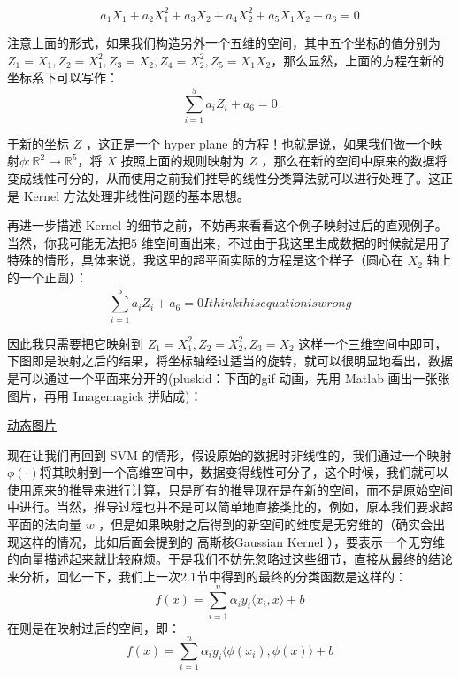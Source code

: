 \documentclass[a4paper,12pt]{article}
\begin{document}
\begin{equation}
  a_1X_1+a_2X_1^2+ a_3X_2+a_4X_2^2+a_5X_1X_2+a_6=0
\end{equation}

 注意上面的形式，如果我们构造另外一个五维的空间，其中五个坐标的值分别为 $Z_1=X_1, Z_2=X^2_1, Z_3=X_2, Z_4=X^2_2, Z_5=X_1X_2$，那么显然，上面的方程在新的坐标系下可以写作：
\begin{equation}
  \sum_{i=1}^5a_iZ_i+a_6=0
\end{equation}

于新的坐标 $Z$ ，这正是一个 hyper plane 的方程！也就是说，如果我们做一个映射$\phi:\mathbb{R}^2\rightarrow\mathbb{R}^5$，将 $X$ 按照上面的规则映射为 $Z$ ，那么在新的空间中原来的数据将变成线性可分的，从而使用之前我们推导的线性分类算法就可以进行处理了。这正是 Kernel 方法处理非线性问题的基本思想。

再进一步描述 Kernel 的细节之前，不妨再来看看这个例子映射过后的直观例子。当然，你我可能无法把$ 5$ 维空间画出来，不过由于我这里生成数据的时候就是用了特殊的情形，具体来说，我这里的超平面实际的方程是这个样子（圆心在 $X_2$ 轴上的一个正圆）：
\begin{equation}
  \sum_{i=1}^5a_iZ_i+a_6=0
  I think this equation is wrong
\end{equation}

因此我只需要把它映射到 $Z_1=X^2_1, Z_2=X_2^2, Z_3=X_2$ 这样一个三维空间中即可，下图即是映射之后的结果，将坐标轴经过适当的旋转，就可以很明显地看出，数据是可以通过一个平面来分开的(pluskid：下面的gif 动画，先用 Matlab 画出一张张图片，再用 Imagemagick 拼贴成)：
\begin{center}\href{http://img.my.csdn.net/uploads/201304/03/1364952814\_3505.gif}{动态图片}\end{center}

现在让我们再回到 SVM 的情形，假设原始的数据时非线性的，我们通过一个映射$\phi(\cdot)$将其映射到一个高维空间中，数据变得线性可分了，这个时候，我们就可以使用原来的推导来进行计算，只是所有的推导现在是在新的空间，而不是原始空间中进行。当然，推导过程也并不是可以简单地直接类比的，例如，原本我们要求超平面的法向量 $w$ ，但是如果映射之后得到的新空间的维度是无穷维的（确实会出现这样的情况，比如后面会提到的 高斯核Gaussian Kernel ），要表示一个无穷维的向量描述起来就比较麻烦。于是我们不妨先忽略过这些细节，直接从最终的结论来分析，回忆一下，我们上一次2.1节中得到的最终的分类函数是这样的：
\begin{equation}
  f(x)=\sum_{i=1}^n\alpha_iy_i\langle x_i,x\rangle+b
\end{equation}
在则是在映射过后的空间，即：
\begin{equation}
  f(x)=\sum_{i=1}^n\alpha_iy_i\langle\phi(x_i),\phi(x)\rangle+b
\end{equation}
\end{document}
